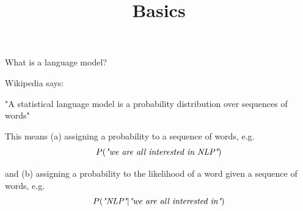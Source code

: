 


\newcommand*\POS[1]{\textsubscript{\texttt{#1}}} %
\usepackage{qtree} %

\newcommand{\titlefigure}{figure/bengio03.png}
\newcommand{\learninggoals}{
\item defined the key learning goals here
\item second learning goal}

\title{Basics}
\date{}





\begin{frame}{What is a language model?}
\vspace{.5cm}
\begin{block}{Wikipedia says:}
    \begin{center}
    "A statistical language model is a probability distribution over sequences of words"
    \end{center}
\end{block}
\begin{block}{This means (a) assigning a probability to a sequence of words, e.g.}
    \[
    P(\mbox{\it "we are all interested in NLP"})
    \]
\end{block}
\begin{block}{and (b) assigning a probability to the likelihood of a word given a sequence of words, e.g.}
    \[
    P(\mbox{\it "NLP"} | \mbox{\it "we are all interested in"})
    \]
\end{block}
\end{frame}


